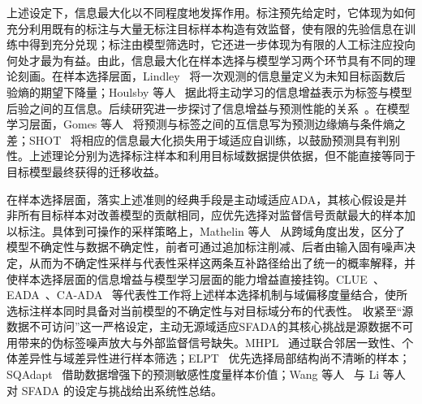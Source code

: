 上述设定下，信息最大化以不同程度地发挥作用。标注预先给定时，它体现为如何充分利用既有的标注与大量无标注目标样本构造有效监督，使有限的先验信息在训练中得到充分兑现；标注由模型筛选时，它还进一步体现为有限的人工标注应投向何处才最为有益。由此，信息最大化在样本选择与模型学习两个环节具有不同的理论刻画。在样本选择层面，Lindley~\cite{lindley1956information} 将一次观测的信息量定义为未知目标函数后验熵的期望下降量；Houlsby 等人~\cite{houlsby2011bayesian} 据此将主动学习的信息增益表示为标签与模型后验之间的互信息。后续研究进一步探讨了信息增益与预测性能的关系~\cite{kirsch2022unifying,bickfordsmith2023prediction,gajjar2023active}。在模型学习层面，Gomes 等人~\cite{gomes2010discriminative} 将预测与标签之间的互信息写为预测边缘熵与条件熵之差；SHOT~\cite{liang2021source} 将相应的信息最大化损失用于域适应自训练，以鼓励预测具有判别性。上述理论分别为选择标注样本和利用目标域数据提供依据，但不能直接等同于目标模型最终获得的迁移收益。

在样本选择层面，落实上述准则的经典手段是主动域适应ADA，其核心假设是并非所有目标样本对改善模型的贡献相同，应优先选择对监督信号贡献最大的样本加以标注。具体到可操作的采样策略上，Mathelin 等人~\cite{mathelin2022discrepancy} 从跨域角度出发，区分了模型不确定性与数据不确定性，前者可通过追加标注削减、后者由输入固有噪声决定，从而为不确定性采样与代表性采样这两条互补路径给出了统一的概率解释，并使样本选择层面的信息增益与模型学习层面的能力增益直接挂钩。CLUE~\cite{prabhu2021active}、EADA~\cite{xie2022active}、CA-ADA~\cite{xiao2024category} 等代表性工作将上述样本选择机制与域偏移度量结合，使所选标注样本同时具备对当前模型的不确定性与对目标域分布的代表性。
收紧至“源数据不可访问”这一严格设定，主动无源域适应SFADA的其核心挑战是源数据不可用带来的伪标签噪声放大与外部监督信号缺失。MHPL~\cite{MHPL} 通过联合邻居一致性、个体差异性与域差异性进行样本筛选；ELPT~\cite{li2022source} 优先选择局部结构尚不清晰的样本；SQAdapt~\cite{SQAdapt} 借助数据增强下的预测敏感性度量样本价值；Wang 等人~\cite{wang2023mhpl} 与 Li 等人~\cite{li2023source} 对 SFADA 的设定与挑战给出系统性总结。

